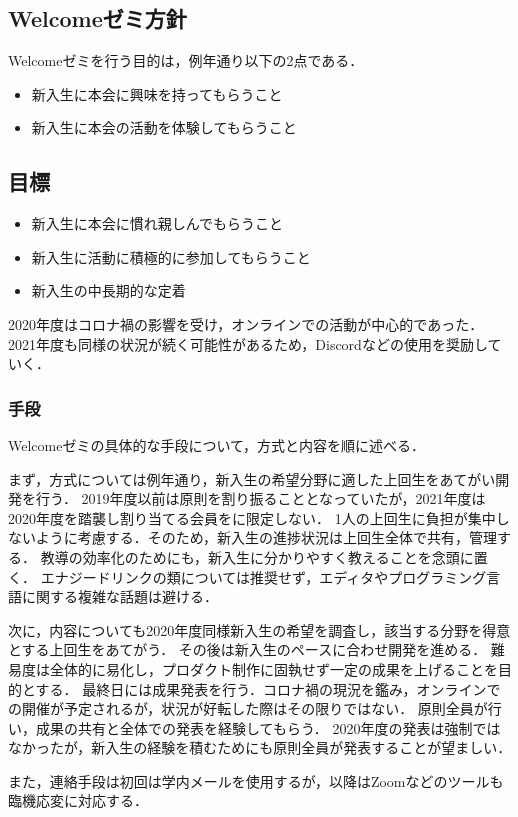 \subsection*{Welcomeゼミ方針}


Welcomeゼミを行う目的は，例年通り以下の2点である．

\begin{itemize}
    \item 新入生に本会に興味を持ってもらうこと
    \item 新入生に本会の活動を体験してもらうこと
\end{itemize}

\subsection*{目標}
\begin{itemize}
    \item 新入生に本会に慣れ親しんでもらうこと
    \item 新入生に活動に積極的に参加してもらうこと
    \item 新入生の中長期的な定着
\end{itemize}

2020年度はコロナ禍の影響を受け，オンラインでの活動が中心的であった．
2021年度も同様の状況が続く可能性があるため，Discordなどの使用を奨励していく．

\subsubsection*{手段}
Welcomeゼミの具体的な手段について，方式と内容を順に述べる．

まず，方式については例年通り，新入生の希望分野に適した上回生をあてがい開発を行う．
2019年度以前は原則\secondGrade{}を割り振ることとなっていたが，2021年度は2020年度を踏襲し割り当てる会員を\secondGrade{}に限定しない．
1人の上回生に負担が集中しないように考慮する．そのため，新入生の進捗状況は上回生全体で共有，管理する．
教導の効率化のためにも，新入生に分かりやすく教えることを念頭に置く．
エナジードリンクの類については推奨せず，エディタやプログラミング言語に関する複雑な話題は避ける．

次に，内容についても2020年度同様新入生の希望を調査し，該当する分野を得意とする上回生をあてがう．
その後は新入生のペースに合わせ開発を進める．
難易度は全体的に易化し，プロダクト制作に固執せず一定の成果を上げることを目的とする．
最終日には成果発表を行う．コロナ禍の現況を鑑み，オンラインでの開催が予定されるが，状況が好転した際はその限りではない．
原則全員が行い，成果の共有と全体での発表を経験してもらう．
2020年度の発表は強制ではなかったが，新入生の経験を積むためにも原則全員が発表することが望ましい．

また，連絡手段は初回は学内メールを使用するが，以降はZoomなどのツールも臨機応変に対応する．

